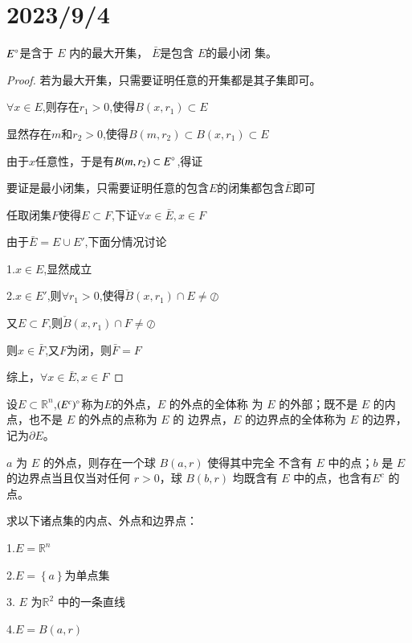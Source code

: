 \documentclass[lang=cn,10pt]{elegantbook}
\begin{document}
\section{2023/9/4}
\begin{theorem}
$	E\degree$是含于 $E$ 内的最大开集， $\bar E$是包含 $E $的最小闭
	集。
\end{theorem}
\begin{proof}
	
	若为最大开集，只需要证明任意的开集都是其子集即可。
	
	$\forall x \in E$,则存在$r_{1}>0$,使得$B(x,r_{1})\subset E$
	
	显然存在$m$和$r_{2}>0$,使得$B(m,r_{2})\subset B(x,r_{1})\subset E$
	
	由于$x$任意性，于是有$B(m,r_{2}) \subset E \degree$,得证
	
	要证是最小闭集，只需要证明任意的包含$E$的闭集都包含$\bar{E}$即可
	
	任取闭集$F$使得$E\subset F$,下证$\forall x \in \bar{E},x\in F  $
	
	由于$\bar{E}=E\cup E'$,下面分情况讨论
	
	1.$x\in E$,显然成立
	
	2.$x \in E'$,则$\forall r_{1}>0$,使得$\check{B}(x,r_{1})\cap E\ne\oslash$
	
    又$E\subset F$,则$\check{B}(x,r_{1})\cap F\ne\oslash$
    
    则$x\in \bar{F}$,又$F$为闭，则$\bar{F}=F$
    
    综上，$\forall x \in \bar{E},x\in F  $
\end{proof}
\begin{definition}
	设$E\subset \mathbb{R} ^n$,$	(E^{c})\degree $称为$E$的外点，$E$ 的外点的全体称
	为 $E$ 的外部；既不是 $E$ 的内点，也不是 $E$ 的外点的点称为 $E$ 的
	边界点，$E$ 的边界点的全体称为 $E$ 的边界，记为$\partial E$。
\end{definition}
\begin{remark}
	$a$ 为 $E$ 的外点，则存在一个球 $B(a, r)$ 使得其中完全
	不含有 $E$ 中的点；$b$ 是 $E$ 的边界点当且仅当对任何 $r > 0$，球
	$B(b, r)$ 均既含有 $E$ 中的点，也含有$ E^{c}$
	的点。
\end{remark}
\begin{example}
	求以下诸点集的内点、外点和边界点：
	
	1.$E=\mathbb{R} ^n$
	
	2.$E=\left\{ a \right\} \text{为单点集}$
	
	3. $E$ 为$\mathbb{R} ^2 $ 中的一条直线
	
	4.$E = B(a, r)$
\end{example}
\end{document}

